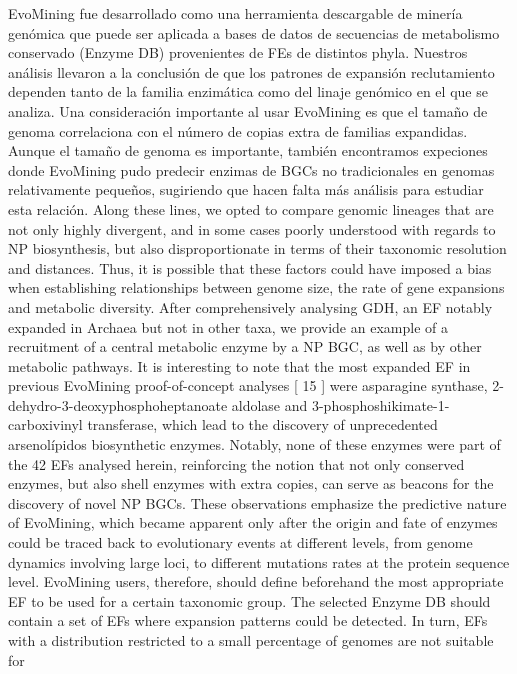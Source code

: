 \documentclass[12pt,twoside]{reedthesis}
\begin{document}
  EvoMining fue desarrollado como una herramienta descargable de minería
  genómica que puede ser aplicada a bases de datos de secuencias de
  metabolismo conservado (Enzyme DB) provenientes de FEs de distintos
  phyla. Nuestros análisis llevaron a la conclusión de que los patrones de
  expansión reclutamiento dependen tanto de la familia enzimática como del
  linaje genómico en el que se analiza. Una consideración importante al
  usar EvoMining es que el tamaño de genoma correlaciona con el número de
  copias extra de familias expandidas. Aunque el tamaño de genoma es
  importante, también encontramos expeciones donde EvoMining pudo predecir
  enzimas de BGCs no tradicionales en genomas relativamente pequeños,
  sugiriendo que hacen falta más análisis para estudiar esta relación.
  Along these lines, we opted to compare genomic lineages that are not
  only highly divergent, and in some cases poorly understood with regards
  to NP biosynthesis, but also disproportionate in terms of their
  taxonomic resolution and distances. Thus, it is possible that these
  factors could have imposed a bias when establishing relationships
  between genome size, the rate of gene expansions and metabolic
  diversity. After comprehensively analysing GDH, an EF notably expanded
  in Archaea but not in other taxa, we provide an example of a recruitment
  of a central metabolic enzyme by a NP BGC, as well as by other metabolic
  pathways. It is interesting to note that the most expanded EF in
  previous EvoMining proof-of-concept analyses {[} 15 {]} were asparagine
  synthase, 2-dehydro-3-deoxyphosphoheptanoate aldolase and
  3-phosphoshikimate-1-carboxivinyl transferase, which lead to the
  discovery of unprecedented arsenolípidos biosynthetic enzymes. Notably,
  none of these enzymes were part of the 42 EFs analysed herein,
  reinforcing the notion that not only conserved enzymes, but also shell
  enzymes with extra copies, can serve as beacons for the discovery of
  novel NP BGCs. These observations emphasize the predictive nature of
  EvoMining, which became apparent only after the origin and fate of
  enzymes could be traced back to evolutionary events at different levels,
  from genome dynamics involving large loci, to different mutations rates
  at the protein sequence level. EvoMining users, therefore, should define
  beforehand the most appropriate EF to be used for a certain taxonomic
  group. The selected Enzyme DB should contain a set of EFs where
  expansion patterns could be detected. In turn, EFs with a distribution
  restricted to a small percentage of genomes are not suitable for
\end{document}
